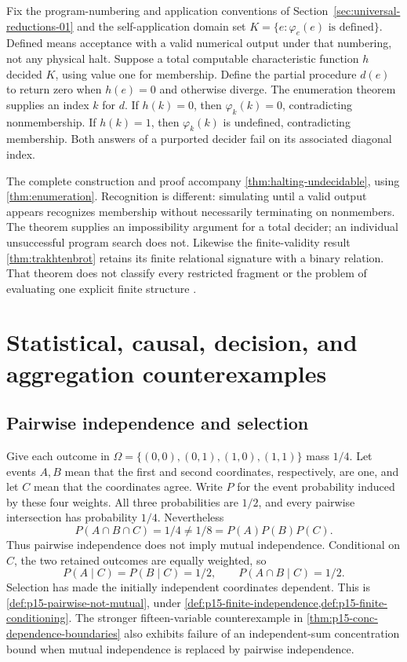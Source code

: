 Fix the program-numbering and application conventions of
Section~\ref{sec:universal-reductions-01} and
the self-application domain set
\(K=\{e:\varphi_e(e)\text{ is defined}\}\).
Defined means acceptance with a valid numerical output under that numbering,
not any physical halt. Suppose a total computable characteristic function
\(h\) decided \(K\), using value one for membership. Define the partial
procedure \(d(e)\) to return zero when \(h(e)=0\) and otherwise diverge.
The enumeration theorem supplies an index \(k\) for \(d\).
If \(h(k)=0\), then \(\varphi_k(k)=0\), contradicting nonmembership.
If \(h(k)=1\), then \(\varphi_k(k)\) is undefined, contradicting membership.
Both answers of a purported decider fail on its associated diagonal index.

The complete construction and proof accompany
\cref{thm:halting-undecidable}, using
\cref{thm:enumeration}\cite{Kleene1952}. Recognition is different:
simulating until a valid output appears recognizes membership without
necessarily terminating on nonmembers. The theorem supplies an impossibility
argument for a total decider; an individual unsuccessful program search does
not. Likewise the finite-validity result \cref{thm:trakhtenbrot} retains
its finite relational signature with a binary relation. That theorem does
not classify every restricted fragment or the problem of evaluating one
explicit finite structure \cite{Trakhtenbrot1950}.

\section{Statistical, causal, decision, and aggregation counterexamples}
\label{sec:p14-counter-statistical-causal-decision}

\subsection{Pairwise independence and selection}
\label{sec:p14-counter-independence}

Give each outcome in \(\Omega=\{(0,0),(0,1),(1,0),(1,1)\}\) mass
\(1/4\). Let events \(A,B\) mean that the first and second coordinates,
respectively, are one, and let \(C\) mean that the coordinates agree.
Write \(P\) for the event probability induced by these four weights.
All three probabilities are \(1/2\), and every pairwise intersection
has probability \(1/4\). Nevertheless
\[
 P(A\cap B\cap C)=1/4\ne1/8=P(A)P(B)P(C).
\]
Thus pairwise independence does not imply mutual independence. Conditional
on \(C\), the two retained outcomes are equally weighted, so
\[
 P(A\mid C)=P(B\mid C)=1/2,\qquad P(A\cap B\mid C)=1/2.
\]
Selection has made the initially independent coordinates dependent. This
is \cref{def:p15-pairwise-not-mutual}, under
\cref{def:p15-finite-independence,def:p15-finite-conditioning}. The stronger
fifteen-variable counterexample in \cref{thm:p15-conc-dependence-boundaries}
also exhibits failure of an independent-sum concentration bound when mutual
independence is replaced by pairwise independence.

